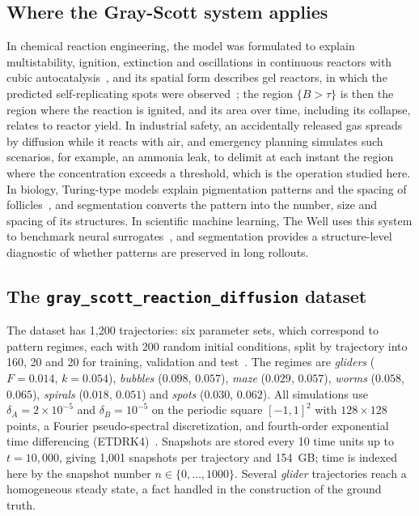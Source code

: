 \documentclass[final,5p,times,twocolumn]{elsarticle}
\begin{document}
\subsection{Where the Gray-Scott system applies}\label{subsec:applications}

In chemical reaction engineering, the model was formulated to explain multistability, ignition, extinction and oscillations in continuous reactors with cubic autocatalysis~\cite{gray1983,gray1984}, and its spatial form describes gel reactors, in which the predicted self-replicating spots were observed~\cite{lee1993}; the region $\{B>\tau\}$ is then the region where the reaction is ignited, and its area over time, including its collapse, relates to reactor yield. In industrial safety, an accidentally released gas spreads by diffusion while it reacts with air, and emergency planning simulates such scenarios, for example, an ammonia leak, to delimit at each instant the region where the concentration exceeds a threshold, which is the operation studied here. In biology, Turing-type models explain pigmentation patterns and the spacing of follicles~\cite{kondo2010,murray2003}, and segmentation converts the pattern into the number, size and spacing of its structures. In scientific machine learning, The Well uses this system to benchmark neural surrogates~\cite{ohana2024well}, and segmentation provides a structure-level diagnostic of whether patterns are preserved in long rollouts.

\subsection{The \texttt{gray\_scott\_reaction\_diffusion} dataset}\label{subsec:dataset}

The dataset has 1,200 trajectories: six parameter sets, which correspond to pattern regimes, each with 200 random initial conditions, split by trajectory into 160, 20 and 20 for training, validation and test~\cite{ohana2024well}. The regimes are \textit{gliders} ($F=0.014$, $k=0.054$), \textit{bubbles} ($0.098$, $0.057$), \textit{maze} ($0.029$, $0.057$), \textit{worms} ($0.058$, $0.065$), \textit{spirals} ($0.018$, $0.051$) and \textit{spots} ($0.030$, $0.062$). All simulations use $\delta_A=2\times10^{-5}$ and $\delta_B=10^{-5}$ on the periodic square $[-1,1]^2$ with $128\times128$ points, a Fourier pseudo-spectral discretization, and fourth-order exponential time differencing (ETDRK4)~\cite{cox2002,kassam2005}. Snapshots are stored every 10 time units up to $t=10{,}000$, giving 1,001 snapshots per trajectory and 154~GB; time is indexed here by the snapshot number $n\in\{0,\dots,1000\}$. Several \textit{glider} trajectories reach a homogeneous steady state, a fact handled in the construction of the ground truth.
\end{document}
